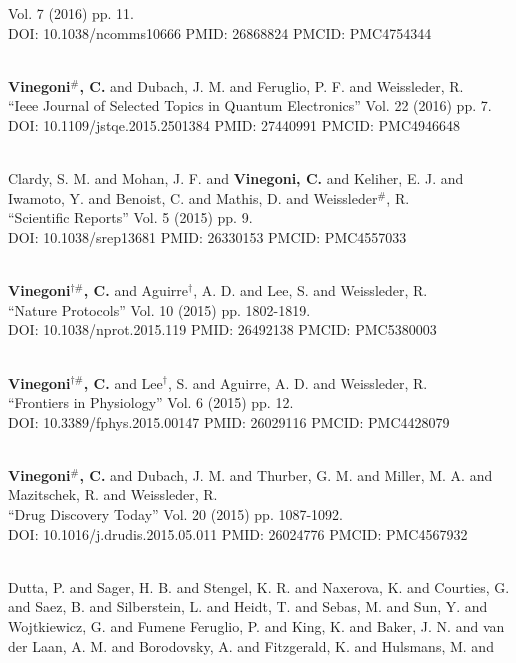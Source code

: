 Vol. 7 (2016) pp. 11. \\ DOI: 10.1038/ncomms10666 PMID: 26868824 PMCID: PMC4754344\item {} \\ {\bf Vinegoni$^\#$, C.} and Dubach, J. M. and Feruglio, P. F. and Weissleder, R. \\ ``Ieee Journal of Selected Topics in Quantum Electronics'' Vol. 22 (2016) pp. 7. \\ DOI: 10.1109/jstqe.2015.2501384 PMID: 27440991 PMCID: PMC4946648\item {} \\ Clardy, S. M. and Mohan, J. F. and {\bf Vinegoni, C.} and Keliher, E. J. and Iwamoto, Y. and Benoist, C. and Mathis, D. and Weissleder$^\#$, R. \\ ``Scientific Reports'' Vol. 5 (2015) pp. 9. \\ DOI: 10.1038/srep13681 PMID: 26330153 PMCID: PMC4557033\item {} \\ {\bf Vinegoni$^{\dag \#}$, C.} and Aguirre$^\dag$, A. D. and Lee, S. and Weissleder, R. \\ ``Nature Protocols'' Vol. 10 (2015) pp. 1802-1819. \\ DOI: 10.1038/nprot.2015.119 PMID: 26492138 PMCID: PMC5380003\item {} \\ {\bf Vinegoni$^{\dag \#}$, C.} and Lee$^\dag$, S. and Aguirre, A. D. and Weissleder, R. \\ ``Frontiers in Physiology'' Vol. 6 (2015) pp. 12. \\ DOI: 10.3389/fphys.2015.00147 PMID: 26029116 PMCID: PMC4428079\item {} \\ {\bf Vinegoni$^\#$, C.} and Dubach, J. M. and Thurber, G. M. and Miller, M. A. and Mazitschek, R. and Weissleder, R. \\ ``Drug Discovery Today'' Vol. 20 (2015) pp. 1087-1092. \\ DOI: 10.1016/j.drudis.2015.05.011 PMID: 26024776 PMCID: PMC4567932\item {} \\ Dutta, P. and Sager, H. B. and Stengel, K. R. and Naxerova, K. and Courties, G. and Saez, B. and Silberstein, L. and Heidt, T. and Sebas, M. and Sun, Y. and Wojtkiewicz, G. and Fumene Feruglio, P. and King, K. and Baker, J. N. and van der Laan, A. M. and Borodovsky, A. and Fitzgerald, K. and Hulsmans, M. and 